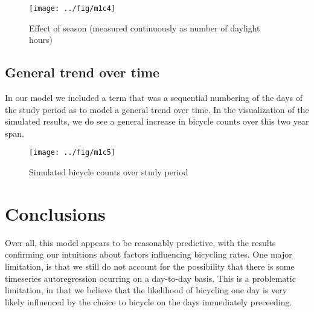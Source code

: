 \documentclass[final]{beamer}
\begin{document}
\begin{frame}[t]
\begin{multicols}{3}
\begin{figure}[htbp]
\begin{center}
\texttt{[image: ../fig/m1c4]}
\caption{Effect of season (measured continuously as number of daylight
  hours)}
\label{fg:daylight}
\end{center}
\end{figure}

\subsection{General trend over time}
In our model we included a term that was a sequential numbering of the
days of the study period as to model a general trend over time. In the
visualization of the simulated results, we do see a general increase
in bicycle counts over this two year span.

\begin{figure}[htbp]
\begin{center}
\texttt{[image: ../fig/m1c5]}
\caption{Simulated bicycle counts over study period}
\label{fg:trend}
\end{center}
\end{figure}


\section{Conclusions}
Over all, this model appears to be reasonably
predictive, with the results confirming our intuitions about factors
influencing bicycling rates. One major limitation, is that we still do
not account for the possibility that there is some timeseries
autoregression ocurring on a day-to-day basis. This is a problematic
limitation, in that we believe that the likelihood of bicycling one
day is very likely influenced by the choice to bicycle on the days
immediately preceeding.





\end{multicols}
\end{frame}
\end{document}
